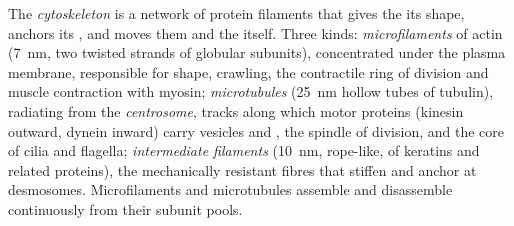 \begin{definition}[Cytoskeleton]\label{def:b1:eukaryotic-cell:cytoskeleton}
The \emph{cytoskeleton} is a network of protein
filaments that gives the  its shape, anchors its , and
moves them and the  itself. Three kinds:
\emph{microfilaments} of actin (\qty{7}{nm},
two twisted strands of globular subunits), concentrated under the
plasma membrane, responsible for  shape, crawling, the contractile
ring of division and muscle contraction with myosin;
\emph{microtubules} (\qty{25}{nm} hollow tubes of
tubulin), radiating from the \emph{centrosome},
tracks along which motor proteins (kinesin outward, dynein inward)
carry vesicles and , the spindle of division, and the core of
cilia and flagella; \emph{intermediate filaments} (\qty{10}{nm}, rope-like, of keratins and related proteins),
the mechanically resistant fibres that stiffen  and anchor at
desmosomes. Microfilaments and microtubules assemble and disassemble
continuously from their subunit pools.
\end{definition}

